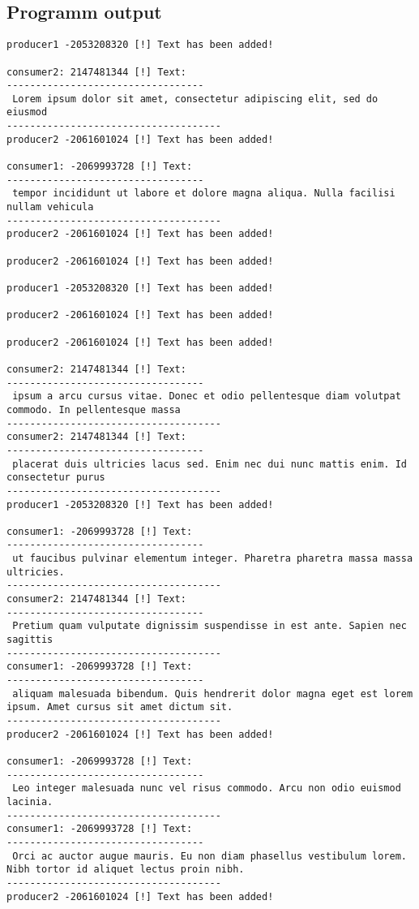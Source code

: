 \documentclass{article}
\begin{document}
\subsection{Programm output}
\normalsize
\begin{lstlisting}[]
producer1 -2053208320 [!] Text has been added! 

consumer2: 2147481344 [!] Text: 
----------------------------------
 Lorem ipsum dolor sit amet, consectetur adipiscing elit, sed do eiusmod 
-------------------------------------
producer2 -2061601024 [!] Text has been added! 

consumer1: -2069993728 [!] Text: 
----------------------------------
 tempor incididunt ut labore et dolore magna aliqua. Nulla facilisi nullam vehicula 
-------------------------------------
producer2 -2061601024 [!] Text has been added! 

producer2 -2061601024 [!] Text has been added! 

producer1 -2053208320 [!] Text has been added! 

producer2 -2061601024 [!] Text has been added! 

producer2 -2061601024 [!] Text has been added! 

consumer2: 2147481344 [!] Text: 
----------------------------------
 ipsum a arcu cursus vitae. Donec et odio pellentesque diam volutpat commodo. In pellentesque massa
-------------------------------------
consumer2: 2147481344 [!] Text: 
----------------------------------
 placerat duis ultricies lacus sed. Enim nec dui nunc mattis enim. Id consectetur purus
-------------------------------------
producer1 -2053208320 [!] Text has been added! 

consumer1: -2069993728 [!] Text: 
----------------------------------
 ut faucibus pulvinar elementum integer. Pharetra pharetra massa massa ultricies.
-------------------------------------
consumer2: 2147481344 [!] Text: 
----------------------------------
 Pretium quam vulputate dignissim suspendisse in est ante. Sapien nec sagittis
-------------------------------------
consumer1: -2069993728 [!] Text: 
----------------------------------
 aliquam malesuada bibendum. Quis hendrerit dolor magna eget est lorem ipsum. Amet cursus sit amet dictum sit.
-------------------------------------
producer2 -2061601024 [!] Text has been added! 

consumer1: -2069993728 [!] Text: 
----------------------------------
 Leo integer malesuada nunc vel risus commodo. Arcu non odio euismod lacinia. 
-------------------------------------
consumer1: -2069993728 [!] Text: 
----------------------------------
 Orci ac auctor augue mauris. Eu non diam phasellus vestibulum lorem. Nibh tortor id aliquet lectus proin nibh.
-------------------------------------
producer2 -2061601024 [!] Text has been added! 


\end{lstlisting}
\end{document}
